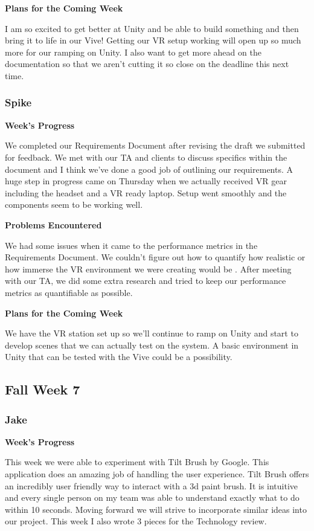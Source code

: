 \documentclass[10pt,journal,compsoc,onecolumn, draftclsnofoot]{IEEEtran}
\begin{document}
\noindent \textbf{Plans for the Coming Week}

I am so excited to get better at Unity and be able to build something and then bring it to life in our Vive!  Getting our VR setup working will open up so much more for our ramping on Unity.  I also want to get more ahead on the documentation so that we aren't cutting it so close on the deadline this next time.

\subsubsection{Spike}
\noindent \textbf{Week's Progress}

We completed our Requirements Document after revising the draft we submitted for feedback. We met with our TA and clients to discuss specifics within the document and I think we've done a good job of outlining our requirements. A huge step in progress came on Thursday when we actually received VR gear including the headset and a VR ready laptop. Setup went smoothly and the components seem to be working well.

\noindent \textbf{Problems Encountered}

We had some issues when it came to the performance metrics in the Requirements Document. We couldn't figure out how to quantify how realistic or how immerse the VR environment we were creating would be . After meeting with our TA, we did some extra research and tried to keep our performance metrics as quantifiable as possible.

\noindent \textbf{Plans for the Coming Week}

We have the VR station set up so we'll continue to ramp on Unity and start to develop scenes that we can actually test on the system. A basic environment in Unity that can be tested with the Vive could be a possibility.

\subsection{Fall Week 7}
\subsubsection{Jake}
\noindent \textbf{Week's Progress}

This week we were able to experiment with Tilt Brush by Google. This application does an amazing job of handling the user experience. Tilt Brush offers an incredibly user friendly way to interact with a 3d paint brush. It is intuitive and every single person on my team was able to understand exactly what to do within 10 seconds. Moving forward we will strive to incorporate similar ideas into our project. This week I also wrote 3 pieces for the Technology review.
\end{document}
